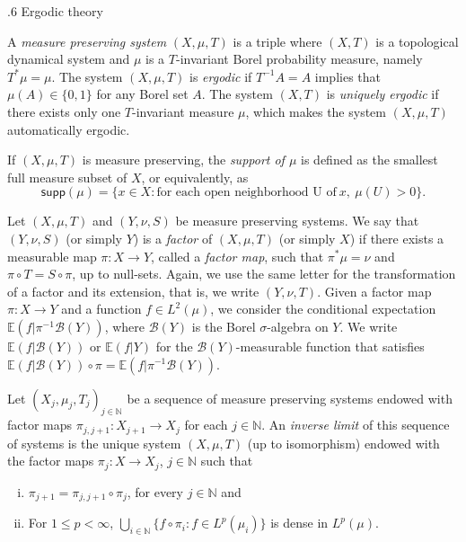 \documentclass[reqno]{amsart}
\makeatletter
\def\N{{\mathbb N}}
\newcommand{\supp}{\mathsf{supp}}
\theoremstyle{definition}
\def\subsection{\@startsection{subsection}{2}%
  \z@{.4\linespacing\@plus.7\linespacing}
{.6\baselineskip}%
  {\normalfont\centering\bfseries}%
}
\theoremstyle{remark}
\def\N{{\mathbb N}}
\makeatother
\begin{document}
\subsection{Ergodic theory}

A \textit{measure preserving system} $(X,\mu,T)$ is a triple where $(X,T)$ is a topological dynamical system and $\mu$ is a $T$-invariant Borel probability measure, namely $T^{*}\mu=\mu$. The system $(X,\mu,T)$ is \textit{ergodic} if $T^{-1}A=A$ implies that $\mu(A)\in \{0,1\}$ for any Borel set $A$. The system $(X,T)$ is \textit{uniquely ergodic} if there exists only one $T$-invariant measure $\mu$, which makes the system $(X,\mu,T)$ automatically ergodic. 

If $(X,\mu,T)$ is measure preserving, the \textit{support of $\mu$} is 
defined as the smallest full measure subset of $X$, or 
equivalently, as 
$$\supp(\mu)=\{x\in X: \text{for each open neighborhood U of}\ x,\ \mu(U)>0\}.$$

Let $(X, \mu,T)$ and $(Y,\nu,S)$ be measure preserving systems. We say that $(Y, \nu,S)$ (or simply $Y$) is a \emph{factor} of $(X, \mu,T)$ (or simply $X$) if there exists a measurable map $\pi \colon X \to Y$, called a \emph{factor map}, such that $\pi^{*}\mu = \nu$ and $\pi \circ T = S \circ \pi$, up to null-sets. Again, we use the same letter for the transformation of a factor and its extension, that is, we write $(Y,\nu,T)$. Given a factor map $\pi: X\to Y$ and a function $f\in L^2(\mu)$, 
we consider the conditional expectation 
$\mathbb{E}(f | \pi^{-1}\mathcal{B}(Y))$, where $\mathcal{B}(Y)$ is the Borel $\sigma$-algebra on $Y$. We write $\mathbb{E}(f | \mathcal{B}(Y))$ or $\mathbb{E}(f | Y)$ for the $\mathcal{B}(Y)$-measurable function that satisfies $\mathbb{E}(f | \mathcal{B}(Y))\circ \pi = \mathbb{E}(f | \pi^{-1}\mathcal{B}(Y))$.

Let $(X_j,\mu_j,T_j)_{j\in \N}$ be a sequence of measure preserving systems endowed with factor maps $\pi_{j,j+1}: X_{j+1}\to X_j$ for each $j\in \N$. An \emph{inverse limit} of this sequence of systems is the unique system $(X,\mu,T)$ (up to isomorphism) endowed with the factor maps $\pi_j:X\to X_j$, $j\in \N$ such that
\begin{enumerate}[(i)]
    \item \label{point inverse 1}  $\pi_{j+1}=\pi_{j,j+1} \circ \pi_j$, for every $j\in \N$ and 
    \item For $1\leq p <\infty$, $\bigcup_{i\in \N} \{f \circ \pi_i : f\in L^p(\mu_i)\}$ is dense in $L^p(\mu)$.
\end{enumerate}
\end{document}
